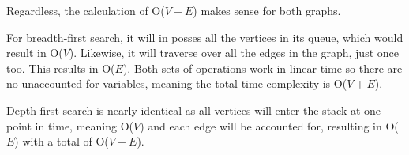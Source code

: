\documentclass[letterpaper, 10pt,DIV=13]{scrartcl}
\numberwithin{equation}{section} %
\numberwithin{figure}{section} %
\numberwithin{table}{section} %
\begin{document}
Regardless, the calculation of O($V + E$) makes sense for both graphs.

For breadth-first search, it will in posses all the vertices in its queue, which would result in O($V$).  Likewise, it will traverse over all the edges in the graph, just once too.  This results in O($E$).  Both sets of operations work in linear time so there are no unaccounted for variables, meaning the total time complexity is O($V + E$). 

Depth-first search is nearly identical as all vertices will enter the stack at one point in time, meaning O($V$) and each edge will be accounted for, resulting in O($E$) with a total of O($V + E$).
\end{document}
